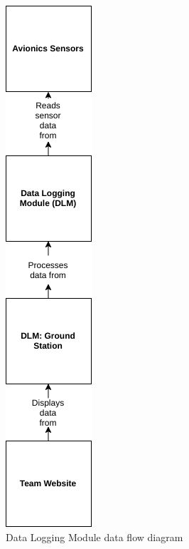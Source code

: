 \documentclass[onecolumn, draftclsnofoot,10pt, compsoc]{IEEEtran}
\begin{document}
\begin{figure}[h]
	\begin{center}
		\caption{Data Logging Module data flow diagram}
		\includegraphics[scale=0.5]{Avionics.png}
	\end{center}
\end{figure}
\end{document}
